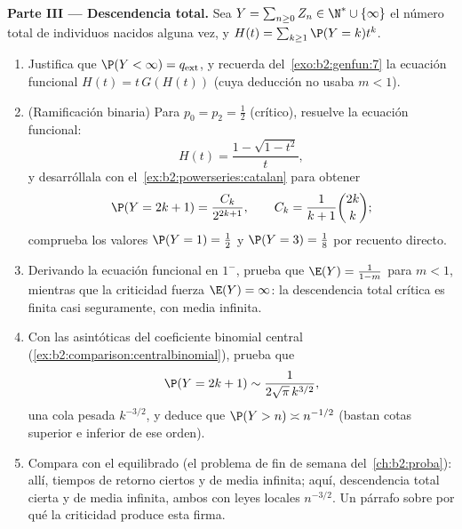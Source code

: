 \begin{problem}
\medskip
\noindent\textbf{Parte III --- Descendencia total.} Sea $Y =
\sum_{n\geq0}Z_n \in \N^* \cup \{\infty\}$ el número total de
individuos nacidos alguna vez, y $H(t) = \sum_{k\geq1}\P(Y =
k)t^k$.
\begin{enumerate}[resume]
  \item Justifica que $\P(Y < \infty) = q_{\mathrm{ext}}$, y recuerda
        del~\cref{exo:b2:genfun:7} la ecuación funcional $H(t) =
        t\,G(H(t))$ (cuya deducción no usaba $m < 1$).
  \item (Ramificación binaria) Para $p_0 = p_2 = \frac12$ (crítico),
        resuelve la ecuación funcional:
        \[
        H(t) = \frac{1 - \sqrt{1 - t^2}}{t},
        \]
        y desarróllala con el~\cref{ex:b2:powerseries:catalan} para
        obtener
        \[
        \P(Y = 2k + 1) = \frac{C_k}{2^{2k+1}},
        \qquad C_k = \frac1{k+1}\binom{2k}k ;
        \]
        comprueba los valores $\P(Y = 1) = \frac12$ y $\P(Y = 3) =
        \frac18$ por recuento directo.
  \item Derivando la ecuación funcional en $1^-$, prueba que $\E(Y) =
        \frac{1}{1-m}$ para $m < 1$, mientras que la criticidad
        fuerza $\E(Y) = \infty$: la descendencia total crítica es
        finita casi seguramente, con media infinita.
  \item Con las asintóticas del coeficiente binomial central
        (\cref{ex:b2:comparison:centralbinomial}), prueba que
        \[
        \P(Y = 2k+1) \sim \frac{1}{2\sqrt\pi\,k^{3/2}},
        \]
        una cola pesada $k^{-3/2}$, y deduce que $\P(Y > n) \asymp
        n^{-1/2}$ (bastan cotas superior e inferior de ese orden).
  \item Compara con el  equilibrado (el problema de
        fin de semana del~\cref{ch:b2:proba}): allí, tiempos de
        retorno ciertos y de media infinita; aquí, descendencia total
        cierta y de media infinita, ambos con leyes locales
        $n^{-3/2}$. Un párrafo sobre por qué la criticidad produce
        esta firma.
\end{enumerate}


\end{problem}
